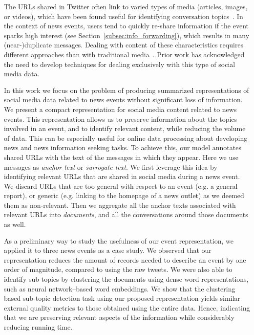 %
%
The URLs shared in Twitter often link to varied types of media (articles,
images, or videos), which have been found useful for identifying conversation
topics~\cite{mishne2012twanchor}.
%
In the context of news events, users tend to quickly re-share information if the
event sparks high interest (see Section~\ref{subsec:info_forwarding}), which
results in many (near-)duplicate messages.
%
Dealing with content of these characteristics requires different approaches
than with traditional media~\cite{Alonso:2017:WHH:3091478.3091484}.
%
Prior work has acknowledged the need to develop techniques for dealing
exclusively with this type of social media data.





In this work we focus on the problem of producing summarized representations of
social media data related to news events without significant loss of
information.
%
We present a compact representation for social media content related to news
events.
%
This representation allows us to preserve information about the topics involved
in an event, and to identify relevant content, while reducing the volume of
data.
%
This can be especially useful for online data processing about developing news
and news information seeking tasks.
%
To achieve this, our model annotates shared URLs with the text of the messages
in which they appear.
%
Here we use messages as {\em anchor text} or {\em surrogate text}. 
%
We first leverage this idea by identifying relevant URLs that are shared in
social media during a news event.
%
We discard URLs that are too general with respect to an event (e.g. a general
report), or generic (e.g. linking to the homepage of a news outlet) as we deemed
them as non-relevant.
%
Then we aggregate all the anchor texts associated with relevant URLs into {\em
documents}, and all the conversations around those documents as well. 

As a preliminary way to study the usefulness of our event representation, we
applied it to three news events as a case study.
%
We observed that our representation reduces the amount of records needed to
describe an event by one order of magnitude, compared to using the raw tweets. 
%
We were also able to identify sub-topics by clustering the documents using dense
word representations, such as neural network--based word embeddings. 
%
We show that the clustering based sub-topic detection task using our proposed
representation yields similar external quality metrics to those obtained using
the entire data. 
%
Hence, indicating that we are preserving relevant aspects of the information
while considerably reducing running time.


